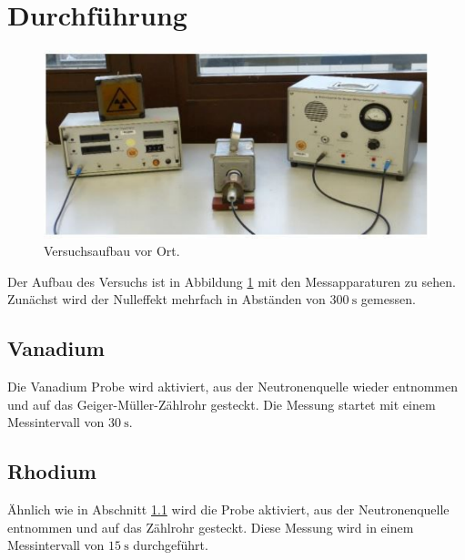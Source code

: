 \section{Durchführung}
\label{sec:Durchführung}
\begin{figure}
    \includegraphics[width=\textwidth]{content/AufbauFoto.pdf}
    \caption{Versuchsaufbau vor Ort.\cite{anleitung}}
    \label{fig:AufbauFoto}
\end{figure}
Der Aufbau des Versuchs ist in Abbildung \ref{fig:AufbauFoto} mit den Messapparaturen zu sehen.
Zunächst wird der Nulleffekt mehrfach in Abständen von $\SI{300}{\second}$ gemessen.
\subsection{Vanadium}\label{subsec:vanadium}
Die Vanadium Probe wird aktiviert, aus der Neutronenquelle wieder entnommen und auf das Geiger-Müller-Zählrohr gesteckt.
Die Messung startet mit einem Messintervall von $\SI{30}{\second}$.
\subsection{Rhodium}
Ähnlich wie in Abschnitt \ref{subsec:vanadium} wird die Probe aktiviert, aus der Neutronenquelle entnommen und auf das Zählrohr gesteckt.
Diese Messung wird in einem Messintervall von $\SI{15}{\second}$ durchgeführt.